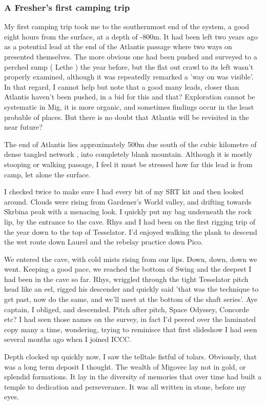 \documentclass[onecolumn]{book}
\begin{document}
\subsubsection{ A Fresher's first camping trip}
My first camping trip took me to the southernmost end of the system, a good eight hours from the surface, at a depth of -800m. It had been left two years ago as a potential lead at the end of the Atlantis passage where two ways on presented themselves. The more obvious one had been pushed and surveyed to a perched sump ( Lethe ) the year before, but the flat out crawl to its left wasn't properly examined, although it was repeatedly remarked a 'way on was visible'. In that regard, I cannot help but note that a good many leads, closer than Atlantis haven't been pushed, in a bid for this and that? Exploration cannot be systematic in Mig, it is more organic, and sometimes findings occur in the least probable of places. But there is no doubt that Atlantis will be revisited in the near future?

The end of Atlantis lies approximately 500m due south of the cubic kilometre of dense tangled network , into completely blank mountain. Although it is mostly stooping or walking passage, I feel it must be stressed how far this lead is from camp, let alone the surface.

I checked twice to make sure I had every bit of my SRT kit and then looked around. Clouds were rising from Gardener's World valley, and drifting towards Skrbina peak with a menacing look. I quickly put my bag underneath the rock lip, by the entrance to the cave. Rhys and I had been on the first rigging trip of the year down to the top of Tesselator. I'd enjoyed walking the plank to descend the wet route down Laurel and the rebelay practice down Pico.

We entered the cave, with cold mists rising from our lips. Down, down, down we went. Keeping a good pace, we reached the bottom of Swing and the deepest I had been in the cave so far. Rhys, wriggled through the tight Tesselator pitch head like an eel, rigged his descender and quickly said 'that was the technique to get past, now do the same, and we'll meet at the bottom of the shaft series'. Aye captain, I obliged, and descended. Pitch after pitch, Space Odyssey, Concorde etc? I had seen those names on the survey, in fact I'd peered over the laminated copy many a time, wondering, trying to reminisce that first slideshow I had seen several months ago when I joined ICCC. 

Depth clocked up quickly now, I saw the telltale fistful of tolars. Obviously, that was a long term deposit I thought. The wealth of Migovec lay not in gold, or splendid formations. It lay in the diversity of memories that over time had built a temple to dedication and perseverance. It was all written in stone, before my eyes.
\end{document}

